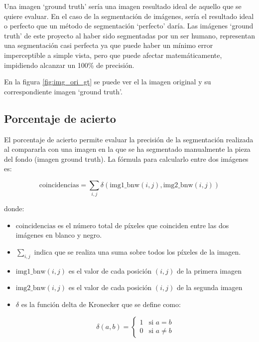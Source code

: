 Una imagen `ground truth' sería una imagen resultado ideal de aquello que se quiere evaluar. En el caso de la segmentación de imágenes, sería el resultado ideal o perfecto que un método de segmentación `perfecto' daría. Las imágenes `ground truth' de este proyecto al haber sido segmentadas por un ser humano, representan una segmentación casi perfecta ya que puede haber un mínimo error imperceptible a simple vista, pero que puede afectar matemáticamente, impidiendo alcanzar un 100\% de precisión.

En la figura \ref{fig:img_ori_gt} se puede ver el la imagen original y su correspondiente imagen `ground truth'.


\subsection{Porcentaje de acierto}\label{porcentaje-de-acierto}

El porcentaje de acierto permite evaluar la precisión de la segmentación realizada al compararla con una imagen en la que se ha segmentado manualmente la pieza del fondo (imagen ground truth). La fórmula para calcularlo entre dos imágenes es:

$$\text{coincidencias} = \sum_{i,j} \delta(\text{img1\_bnw}(i,j), \text{img2\_bnw}(i,j))$$

donde:

\begin{itemize}
\setlength{\itemsep}{-1ex}
    \item{\begin{flushleft}  $\text{coincidencias}$ es el número total de píxeles que coinciden entre las dos imágenes en blanco y negro. \end{flushleft}}
    \item{\begin{flushleft} $\sum_{i,j}$ indica que se realiza una suma sobre todos los píxeles de la imagen. \end{flushleft}}
    \item{\begin{flushleft} $\text{img1\_bnw}(i,j)$ es el valor de cada posición $(i,j)$ de la primera imagen \end{flushleft}}
    \item{\begin{flushleft} $\text{img2\_bnw}(i,j)$ es el valor de cada posición $(i,j)$ de la segunda imagen \end{flushleft}}
    \item{\begin{flushleft} $\delta$ es la función delta de Kronecker que se define como:

    $$\delta(a, b) = 
    \begin{cases} 
    1 & \text{si } a = b \\
    0 & \text{si } a \neq b 
    \end{cases}$$
    \end{flushleft}}
\end{itemize}

